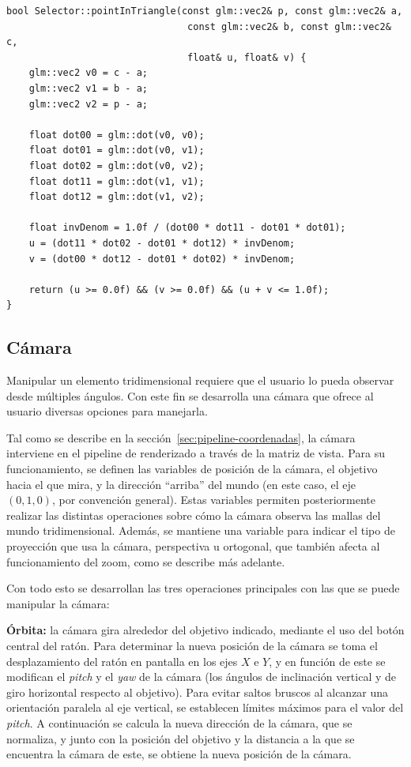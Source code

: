\begin{listing}[htb]
\begin{verbatim}
bool Selector::pointInTriangle(const glm::vec2& p, const glm::vec2& a,
                                const glm::vec2& b, const glm::vec2& c,
                                float& u, float& v) {
    glm::vec2 v0 = c - a;
    glm::vec2 v1 = b - a;
    glm::vec2 v2 = p - a;

    float dot00 = glm::dot(v0, v0);
    float dot01 = glm::dot(v0, v1);
    float dot02 = glm::dot(v0, v2);
    float dot11 = glm::dot(v1, v1);
    float dot12 = glm::dot(v1, v2);

    float invDenom = 1.0f / (dot00 * dot11 - dot01 * dot01);
    u = (dot11 * dot02 - dot01 * dot12) * invDenom;
    v = (dot00 * dot12 - dot01 * dot02) * invDenom;

    return (u >= 0.0f) && (v >= 0.0f) && (u + v <= 1.0f);
}
\end{verbatim}
\caption{Comprobación de punto dentro de triángulo mediante cálculo de coordenadas baricéntricas.}
\label{code:point-in-triangle}
\end{listing}

\subsection{Cámara} \label{sec:camera}

Manipular un elemento tridimensional requiere que el usuario lo pueda observar desde múltiples ángulos. Con este fin se desarrolla una cámara que ofrece al usuario diversas opciones para manejarla.

Tal como se describe en la sección~\ref{sec:pipeline-coordenadas}, la cámara interviene en el pipeline de renderizado a través de la matriz de vista. Para su funcionamiento, se definen las variables de posición de la cámara, el objetivo hacia el que mira, y la dirección ``arriba'' del mundo (en este caso, el eje $(0, 1, 0)$, por convención general). Estas variables permiten posteriormente realizar las distintas operaciones sobre cómo la cámara observa las mallas del mundo tridimensional. Además, se mantiene una variable para indicar el tipo de proyección que usa la cámara, perspectiva u ortogonal, que también afecta al funcionamiento del zoom, como se describe más adelante.

Con todo esto se desarrollan las tres operaciones principales con las que se puede manipular la cámara:

\textbf{Órbita:} la cámara gira alrededor del objetivo indicado, mediante el uso del botón central del ratón. Para determinar la nueva posición de la cámara se toma el desplazamiento del ratón en pantalla en los ejes $X$ e $Y$, y en función de este se modifican el \emph{pitch} y el \emph{yaw} de la cámara (los ángulos de inclinación vertical y de giro horizontal respecto al objetivo). Para evitar saltos bruscos al alcanzar una orientación paralela al eje vertical, se establecen límites máximos para el valor del \emph{pitch}. A continuación se calcula la nueva dirección de la cámara, que se normaliza, y junto con la posición del objetivo y la distancia a la que se encuentra la cámara de este, se obtiene la nueva posición de la cámara.

